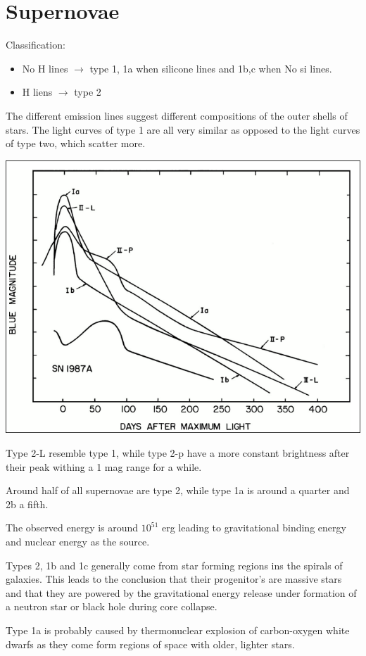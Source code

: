 \documentclass[11pt,a4paper]{article}
\begin{document}
\section{Supernovae}
Classification:
\begin{itemize}
    \item No H lines $\rightarrow$ type 1, 1a when silicone lines and  1b,c when No si lines. 
    \item H liens $\rightarrow$ type 2
\end{itemize}
The different emission lines suggest different compositions of the outer shells of stars. 
The light curves of type 1 are all very similar as opposed to the light curves of type two, which scatter more. 
\begin{center}
    \includegraphics[width=0.5\linewidth]{screenshot_2024-01-24-104355.png}
\end{center}
Type 2-L resemble type 1, while type 2-p have a more constant brightness after their peak withing a 1 mag range for a while.

Around half of all supernovae are type 2, while type 1a is around a quarter and 2b a fifth.

The observed energy is around $10^{51}$ erg leading to gravitational binding energy and nuclear energy as the source. 

Types 2, 1b and 1c generally come from star forming regions ins the spirals of galaxies.
This leads to the conclusion that their progenitor's are massive stars and that they are powered by the gravitational energy release under formation of a neutron star or black hole during core collapse. 

Type 1a is probably caused by thermonuclear explosion of carbon-oxygen white dwarfs as they come form regions of space with older, lighter stars. 
\end{document}
